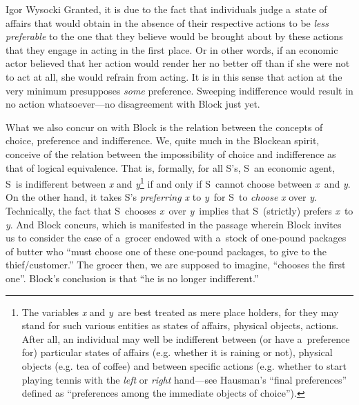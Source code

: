 \begin{artengenv}{Igor Wysocki}
Granted, it is due to the fact that individuals judge a~state of affairs that would obtain in the absence of their respective actions to be \textit{less preferable} to the one that they believe would be brought about by these actions that they engage in acting in the first place. Or in other words, if an economic actor believed that her action would render her no better off than if she were not to act at all, she would refrain from acting. It is in this sense that action at the very minimum presupposes \textit{some} preference. Sweeping indifference would result in no action whatsoever---no disagreement with Block just yet.



What we also concur on with Block is the relation between the concepts of choice, preference and indifference. We, quite much in the Blockean spirit, conceive of the relation between the impossibility of choice and indifference as that of logical equivalence. That is, formally, for all S's, S~an economic agent, S~is indifferent between \textit{x} and \textit{y}\footnote{The variables \textit{x} and \textit{y}~are best treated as mere place holders, for they may stand for such various entities as states of affairs, physical objects, actions. After all, an individual may well be indifferent between (or have a~preference for) particular states of affairs (e.g. whether it is raining or not), physical objects (e.g. tea of coffee) and between specific actions (e.g. whether to start playing tennis with the \textit{left} or \textit{right} hand---see Hausman's 
\parencite*[][p.27]{hausman_preference_2011} %
 ``final preferences'' defined as ``preferences among the immediate objects of choice''). } if and only if S~cannot choose between \textit{x}~and \textit{y}. On the other hand, it takes S's \textit{preferring x} to \textit{y}~for S~to \textit{choose} \textit{x} over \textit{y}. Technically, the fact that S~chooses \textit{x}~over \textit{y}~implies that S~(strictly) prefers \textit{x}~to \textit{y}. And Block 
\parencite*[][p.47]{block_response_2022} %
 concurs, which is manifested in the passage wherein Block invites us to consider the case of a~grocer endowed with a~stock of one-pound packages of butter who ``must choose one of these one-pound packages, to give to the thief/customer.'' The grocer then, we are supposed to imagine, ``chooses the first one''. Block's conclusion is that ``he is no longer indifferent.''




\end{artengenv}
